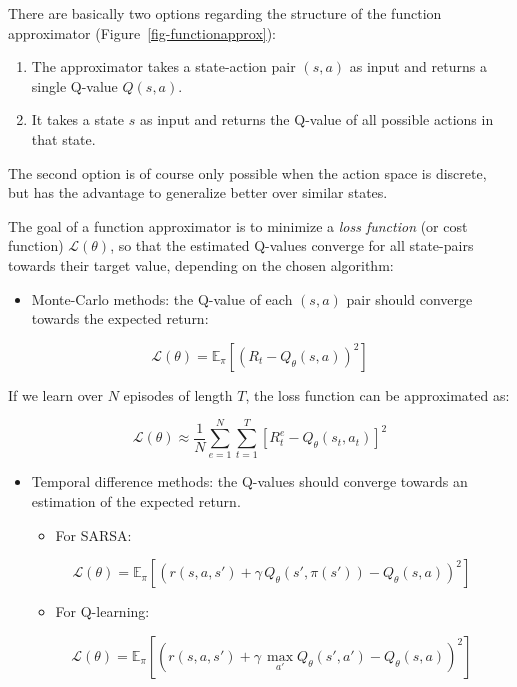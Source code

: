 \documentclass[
  letterpaper,
  DIV=11,
  numbers=noendperiod]{scrreprt}
\providecommand{\tightlist}{%
  \setlength{\itemsep}{0pt}\setlength{\parskip}{0pt}}\usepackage{longtable,booktabs,array}
\begin{document}
There are basically two options regarding the structure of the function
approximator (Figure~\ref{fig-functionapprox}):

\begin{enumerate}
\def\labelenumi{\arabic{enumi}.}
\tightlist
\item
  The approximator takes a state-action pair \((s, a)\) as input and
  returns a single Q-value \(Q(s, a)\).
\item
  It takes a state \(s\) as input and returns the Q-value of all
  possible actions in that state.
\end{enumerate}

The second option is of course only possible when the action space is
discrete, but has the advantage to generalize better over similar
states.

The goal of a function approximator is to minimize a \emph{loss
function} (or cost function) \(\mathcal{L}(\theta)\), so that the
estimated Q-values converge for all state-pairs towards their target
value, depending on the chosen algorithm:

\begin{itemize}
\tightlist
\item
  Monte-Carlo methods: the Q-value of each \((s, a)\) pair should
  converge towards the expected return:
\end{itemize}

\[
    \mathcal{L}(\theta) = \mathbb{E}_\pi[(R_t - Q_\theta(s, a))^2]
\]

If we learn over \(N\) episodes of length \(T\), the loss function can
be approximated as:

\[
    \mathcal{L}(\theta) \approx \frac{1}{N} \sum_{e=1}^N \sum_{t = 1}^T [R^e_t - Q_\theta(s_t, a_t)]^2
\]

\begin{itemize}
\item
  Temporal difference methods: the Q-values should converge towards an
  estimation of the expected return.

  \begin{itemize}
  \tightlist
  \item
    For SARSA:
  \end{itemize}

  \[
    \mathcal{L}(\theta) = \mathbb{E}_\pi[(r(s, a, s') + \gamma \, Q_\theta(s', \pi(s')) - Q_\theta(s, a))^2]
    \]

  \begin{itemize}
  \tightlist
  \item
    For Q-learning:
  \end{itemize}

  \[
    \mathcal{L}(\theta) = \mathbb{E}_\pi[(r(s, a, s') + \gamma \, \max_{a'} Q_\theta(s', a') - Q_\theta(s, a))^2]
    \]
\end{itemize}
\end{document}
